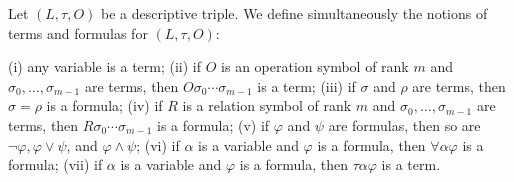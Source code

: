 Let $(L, \tau, O)$ be a descriptive triple. We define simultaneously the notions of terms and formulas for $(L, \tau, O)$:

(i) any variable is a term;
(ii) if $O$ is an operation symbol of rank $m$ and $\sigma_0, \ldots, \sigma_{m-1}$ are terms, then $O\sigma_0 \cdots \sigma_{m-1}$ is a term;
(iii) if $\sigma$ and $\rho$ are terms, then $\sigma = \rho$ is a formula;
(iv) if $R$ is a relation symbol of rank $m$ and $\sigma_0, \ldots, \sigma_{m-1}$ are terms, then $R\sigma_0 \cdots \sigma_{m-1}$ is a formula;
(v) if $\varphi$ and $\psi$ are formulas, then so are $\neg \varphi, \varphi \lor \psi$, and $\varphi \land \psi$;
(vi) if $\alpha$ is a variable and $\varphi$ is a formula, then $\forall\alpha\varphi$ is a formula;
(vii) if $\alpha$ is a variable and $\varphi$ is a formula, then $\tau\alpha\varphi$ is a term.

